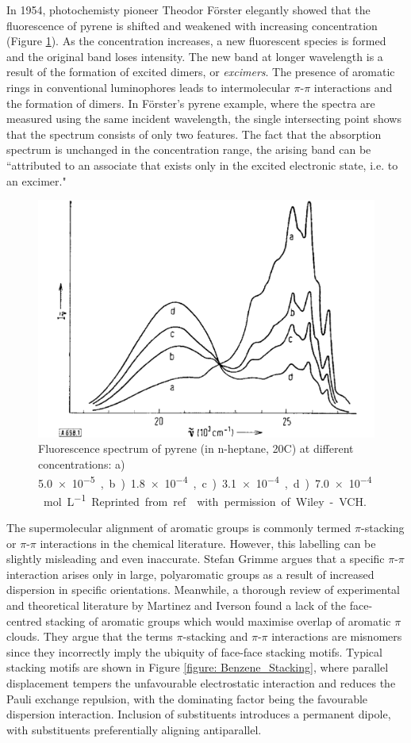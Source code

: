 In 1954, photochemisty pioneer Theodor F\"{o}rster elegantly showed that the fluorescence of pyrene is shifted and weakened with increasing concentration (Figure \ref{figure: Forster_Spectra}).\cite{Forster1954,Forster1969} As the concentration increases, a new fluorescent species is formed and the original band loses intensity. The new band at longer wavelength is a result of the formation of excited dimers, or \textit{excimers}. The presence of aromatic rings in conventional luminophores leads to intermolecular $\pi$-$\pi$ interactions and the formation of dimers. In F\"{o}rster's pyrene example, where the spectra are measured using the same incident wavelength, the single intersecting point shows that the spectrum consists of only two features. The fact that the absorption spectrum is unchanged in the concentration range, the arising band can be ``attributed to an associate that exists only in the excited electronic state, i.e. to an excimer."\cite{Forster1969}
\begin{figure}[H]
\centering
  \includegraphics[width=0.6\linewidth]{Intro/Forster_Spectra.pdf}
  \caption[Fluorescence spectrum of pyrene]{Fluorescence spectrum of pyrene (in n-heptane, 20\degree{}C) at different concentrations: a) \SI{5.0e-5}, b) \SI{1.8e-4}, c) \SI{3.1e-4}, d) \SI{7.0e-4}{mol L^{-1}}. Reprinted from ref.~ with permission of Wiley-VCH.}
  \label{figure: Forster_Spectra}
\end{figure}
The supermolecular alignment of aromatic groups is commonly termed $\pi$-stacking or $\pi$-$\pi$ interactions in the chemical literature. However, this labelling can be slightly misleading and even inaccurate.\cite{Grimme2008,Martinez2012} Stefan Grimme argues that a specific $\pi$-$\pi$interaction arises only in large, polyaromatic groups as a result of increased dispersion in specific orientations.\cite{Grimme2008} Meanwhile, a thorough review of experimental and theoretical literature by Martinez and Iverson found a lack of the face-centred stacking of aromatic groups which would maximise overlap of aromatic $\pi$ clouds.\cite{Martinez2012} They argue that the terms $\pi$-stacking and $\pi$-$\pi$ interactions are misnomers since they incorrectly imply the ubiquity of face-face stacking motifs. Typical stacking motifs are shown in Figure \ref{figure: Benzene_Stacking}, where parallel displacement tempers the unfavourable electrostatic interaction and reduces the Pauli exchange repulsion, with the dominating factor being the favourable dispersion interaction. Inclusion of substituents introduces a permanent dipole, with substituents preferentially aligning antiparallel.\cite{Martinez2012}

